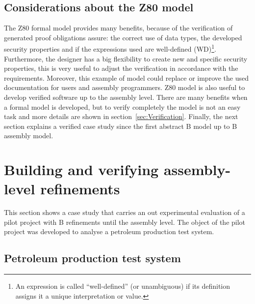 \documentclass[11pt]{article} %
\begin{document}
\subsection{Considerations about the Z80 model}


The Z80 formal model provides many benefits, because of the verification of
generated proof obligations assure: the correct use of data types, the developed
security properties  and if the expressions used are well-defined
(WD)\footnote{An expression is called ``well-defined'' (or unambiguous) if its definition assigns
it a unique interpretation or value.}. Furthermore, the designer has a big
flexibility to create new and specific security properties, this is very useful
to adjust the verification in accordance with the requirements. Moreover, this
example of model could replace or improve the used documentation for users and
assembly programmers. Z80 model is also useful to develop verified software 
up to the assembly level. There are many benefits when a formal model is
developed, but to verify completely the model is not an easy task and more
details are shown in section~\ref{sec:Verification}. Finally, the next section explains
a verified case study since the first abstract B model up to B
assembly model.

\section{Building and verifying assembly-level refinements}
\label{sec:studycase}


This section shows a case study that carries an out experimental evaluation of
a pilot project with B refinements until the assembly level. The object of
the pilot project was developed to analyse a petroleum production test system.  



\subsection{Petroleum production test system}

\end{document}
